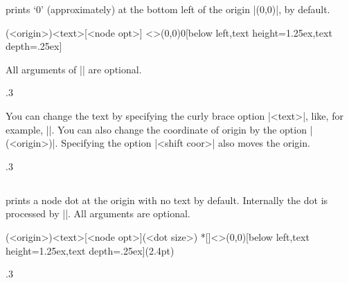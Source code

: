 \icmd{\tzshoworigin} prints `0' (approximately) at the bottom left of the origin |(0,0)|, by default.

\begin{tzdef}{}
(<origin>){<text>}[<node opt>]
  <>(0,0){0}[below left,text height=1.25ex,text depth=.25ex]
\end{tzdef}

All arguments of |\tzshoworigin| are optional.

\begin{tzcode}{.3}
{}
\end{tzcode}

You can change the text by specifying the curly brace option |{<text>}|, like, for example, ||.
You can also change the coordinate of origin by the option |(<origin>)|.
Specifying the option |<shift coor>| also moves the origin.


\begin{tzcode}{.3}
\end{tzcode}


\subsection{\protect\cmd{\tzshoworigin*}}
\label{ss:tzshoworigin*}


\icmd{\tzshoworigin*} prints a node dot at the origin with no text by default.
Internally the dot is processed by |\tzdot*|. All arguments are optional.

\begin{tzdef}{}
(<origin>){<text>}[<node opt>](<dot size>)
 *[]<>(0,0){}[below left,text height=1.25ex,text depth=.25ex](2.4pt)
\end{tzdef}

\begin{tzcode}{.3}
{}
\end{tzcode}

